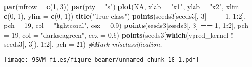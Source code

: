 \documentclass[10pt,ignorenonframetext,]{beamer}
\newenvironment{Shaded}{\begin{snugshade}}{\end{snugshade}}
\newcommand{\KeywordTok}[1]{\textcolor[rgb]{0.13,0.29,0.53}{\textbf{#1}}}
\newcommand{\DataTypeTok}[1]{\textcolor[rgb]{0.13,0.29,0.53}{#1}}
\newcommand{\DecValTok}[1]{\textcolor[rgb]{0.00,0.00,0.81}{#1}}
\newcommand{\FloatTok}[1]{\textcolor[rgb]{0.00,0.00,0.81}{#1}}
\newcommand{\StringTok}[1]{\textcolor[rgb]{0.31,0.60,0.02}{#1}}
\newcommand{\CommentTok}[1]{\textcolor[rgb]{0.56,0.35,0.01}{\textit{#1}}}
\newcommand{\OtherTok}[1]{\textcolor[rgb]{0.56,0.35,0.01}{#1}}
\newcommand{\OperatorTok}[1]{\textcolor[rgb]{0.81,0.36,0.00}{\textbf{#1}}}
\newcommand{\NormalTok}[1]{#1}
\begin{document}
\begin{frame}[fragile]

\begin{Shaded}
\begin{Highlighting}[]
\KeywordTok{par}\NormalTok{(}\DataTypeTok{mfrow =} \KeywordTok{c}\NormalTok{(}\DecValTok{1}\NormalTok{, }\DecValTok{3}\NormalTok{))}
\KeywordTok{par}\NormalTok{(}\DataTypeTok{pty =} \StringTok{"s"}\NormalTok{)}
\KeywordTok{plot}\NormalTok{(}\OtherTok{NA}\NormalTok{, }\DataTypeTok{xlab =} \StringTok{"x1"}\NormalTok{, }\DataTypeTok{ylab =} \StringTok{"x2"}\NormalTok{, }\DataTypeTok{xlim =} \KeywordTok{c}\NormalTok{(}\DecValTok{0}\NormalTok{, }\DecValTok{1}\NormalTok{), }\DataTypeTok{ylim =} \KeywordTok{c}\NormalTok{(}\DecValTok{0}\NormalTok{, }\DecValTok{1}\NormalTok{))}
\KeywordTok{title}\NormalTok{(}\StringTok{"True class"}\NormalTok{)}
\KeywordTok{points}\NormalTok{(seeds3[seeds3[, }\DecValTok{3}\NormalTok{] }\OperatorTok{==}\StringTok{ }\DecValTok{-1}\NormalTok{, }\DecValTok{1}\OperatorTok{:}\DecValTok{2}\NormalTok{], }\DataTypeTok{pch =} \DecValTok{19}\NormalTok{, }\DataTypeTok{col =} \StringTok{"lightcoral"}\NormalTok{, }
    \DataTypeTok{cex =} \FloatTok{0.9}\NormalTok{)}
\KeywordTok{points}\NormalTok{(seeds3[seeds3[, }\DecValTok{3}\NormalTok{] }\OperatorTok{==}\StringTok{ }\DecValTok{1}\NormalTok{, }\DecValTok{1}\OperatorTok{:}\DecValTok{2}\NormalTok{], }\DataTypeTok{pch =} \DecValTok{19}\NormalTok{, }\DataTypeTok{col =} \StringTok{"darkseagreen"}\NormalTok{, }
    \DataTypeTok{cex =} \FloatTok{0.9}\NormalTok{)}
\KeywordTok{points}\NormalTok{(seeds3[}\KeywordTok{which}\NormalTok{(ypred_kernel }\OperatorTok{!=}\StringTok{ }\NormalTok{seeds3[, }\DecValTok{3}\NormalTok{]), }\DecValTok{1}\OperatorTok{:}\DecValTok{2}\NormalTok{], }\DataTypeTok{pch =} \DecValTok{21}\NormalTok{)  }\CommentTok{#Mark misclassification.}
\end{Highlighting}
\end{Shaded}

\texttt{[image: 9SVM\_files/figure-beamer/unnamed-chunk-18-1.pdf]}

\end{frame}
\end{document}
